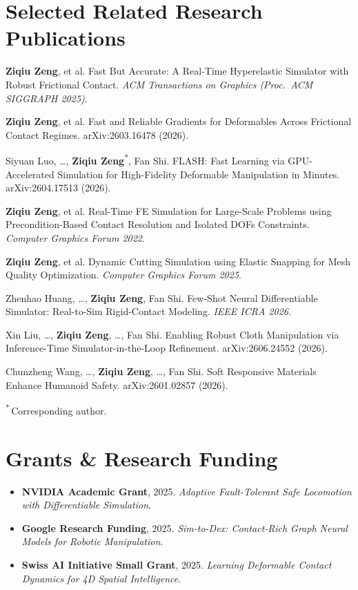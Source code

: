 \documentclass[11pt,a4paper]{article}
\newcommand{\me}{\textbf{Ziqiu Zeng}}
\begin{document}
\section{Selected Related Research Publications}
\begin{pubs}
  \item \me, et al. Fast But Accurate: A Real-Time Hyperelastic Simulator with
        Robust Frictional Contact. \textit{ACM Transactions on Graphics (Proc.\ ACM SIGGRAPH 2025)}.
  \item \me, et al. Fast and Reliable Gradients for Deformables Across Frictional
        Contact Regimes. arXiv:2603.16478 (2026).
  \item Siyuan Luo, \ldots, \me\textsuperscript{*}, Fan Shi. FLASH: Fast Learning via
        GPU-Accelerated Simulation for High-Fidelity Deformable Manipulation in Minutes.
        arXiv:2604.17513 (2026).
  \item \me, et al. Real-Time FE Simulation for Large-Scale Problems using
        Precondition-Based Contact Resolution and Isolated DOFs Constraints.
        \textit{Computer Graphics Forum 2022}.
  \item \me, et al. Dynamic Cutting Simulation using Elastic Snapping for Mesh
        Quality Optimization. \textit{Computer Graphics Forum 2025}.
  \item Zhenhao Huang, \ldots, \me, Fan Shi. Few-Shot Neural Differentiable Simulator:
        Real-to-Sim Rigid-Contact Modeling. \textit{IEEE ICRA 2026}.
  \item Xin Liu, \ldots, \me, \ldots, Fan Shi. Enabling Robust Cloth Manipulation via
        Inference-Time Simulator-in-the-Loop Refinement. arXiv:2606.24552 (2026).
  \item Chunzheng Wang, \ldots, \me, \ldots, Fan Shi. Soft Responsive Materials Enhance
        Humanoid Safety. arXiv:2601.02857 (2026).
\end{pubs}
\vspace{0.2em}
{\footnotesize \textsuperscript{*}\,Corresponding author.}

\section{Grants \& Research Funding}
\begin{itemize}
  \item \textbf{NVIDIA Academic Grant}, 2025. \textit{Adaptive Fault-Tolerant Safe Locomotion with Differentiable Simulation}.
  \item \textbf{Google Research Funding}, 2025. \textit{Sim-to-Dex: Contact-Rich Graph Neural Models for Robotic Manipulation}.
  \item \textbf{Swiss AI Initiative Small Grant}, 2025. \textit{Learning Deformable Contact Dynamics for 4D Spatial Intelligence}.
\end{itemize}
\end{document}
